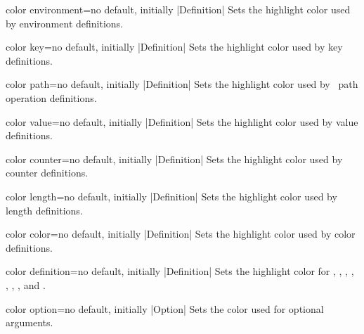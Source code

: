 \begin{docTcbKey}{color environment}{=}{no default, initially |Definition|}
  Sets the highlight color used by environment definitions.
\end{docTcbKey}

\begin{docTcbKey}{color key}{=}{no default, initially |Definition|}
  Sets the highlight color used by key definitions.
\end{docTcbKey}

\begin{docTcbKey}[][doc new={2019-09-18}]{color path}{=}{no default, initially |Definition|}
  Sets the highlight color used by \tikzname\ path operation definitions.
\end{docTcbKey}

\begin{docTcbKey}{color value}{=}{no default, initially |Definition|}
  Sets the highlight color used by value definitions.
\end{docTcbKey}

\begin{docTcbKey}[][doc new={2015-01-08}]{color counter}{=}{no default, initially |Definition|}
  Sets the highlight color used by counter definitions.
\end{docTcbKey}

\begin{docTcbKey}[][doc new={2015-01-08}]{color length}{=}{no default, initially |Definition|}
  Sets the highlight color used by length definitions.
\end{docTcbKey}

\begin{docTcbKey}{color color}{=}{no default, initially |Definition|}
  Sets the highlight color used by color definitions.
\end{docTcbKey}

\begin{docTcbKey}[][doc updated={2019-09-18}]{color definition}{=}{no default, initially |Definition|}
  Sets the highlight color for , ,
  , , , ,
  , and .
\end{docTcbKey}

\begin{docTcbKey}{color option}{=}{no default, initially |Option|}
  Sets the color used for optional arguments.
\end{docTcbKey}

